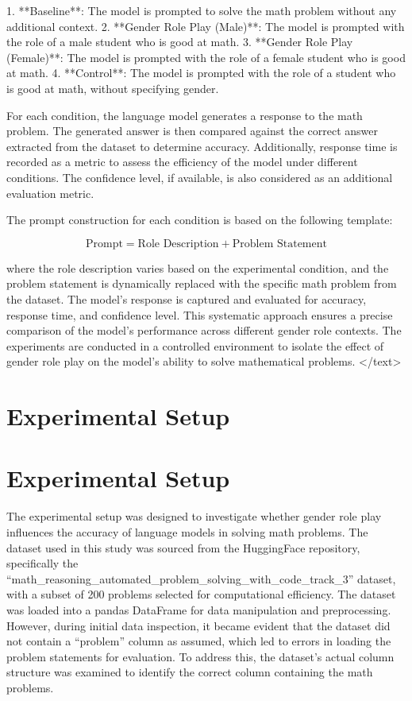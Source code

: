 \documentclass{article}
\begin{document}
1. **Baseline**: The model is prompted to solve the math problem without any additional context.
2. **Gender Role Play (Male)**: The model is prompted with the role of a male student who is good at math.
3. **Gender Role Play (Female)**: The model is prompted with the role of a female student who is good at math.
4. **Control**: The model is prompted with the role of a student who is good at math, without specifying gender.

For each condition, the language model generates a response to the math problem. The generated answer is then compared against the correct answer extracted from the dataset to determine accuracy. Additionally, response time is recorded as a metric to assess the efficiency of the model under different conditions. The confidence level, if available, is also considered as an additional evaluation metric.

The prompt construction for each condition is based on the following template:

$$
\text{Prompt} = \text{Role Description} + \text{Problem Statement}
$$

where the role description varies based on the experimental condition, and the problem statement is dynamically replaced with the specific math problem from the dataset. The model's response is captured and evaluated for accuracy, response time, and confidence level. This systematic approach ensures a precise comparison of the model's performance across different gender role contexts. The experiments are conducted in a controlled environment to isolate the effect of gender role play on the model's ability to solve mathematical problems.
</text>
\section{Experimental Setup}
\section{Experimental Setup}

The experimental setup was designed to investigate whether gender role play influences the accuracy of language models in solving math problems. The dataset used in this study was sourced from the HuggingFace repository, specifically the ``math_reasoning_automated_problem_solving_with_code_track_3'' dataset, with a subset of 200 problems selected for computational efficiency. The dataset was loaded into a pandas DataFrame for data manipulation and preprocessing. However, during initial data inspection, it became evident that the dataset did not contain a ``problem'' column as assumed, which led to errors in loading the problem statements for evaluation. To address this, the dataset's actual column structure was examined to identify the correct column containing the math problems.
\end{document}
